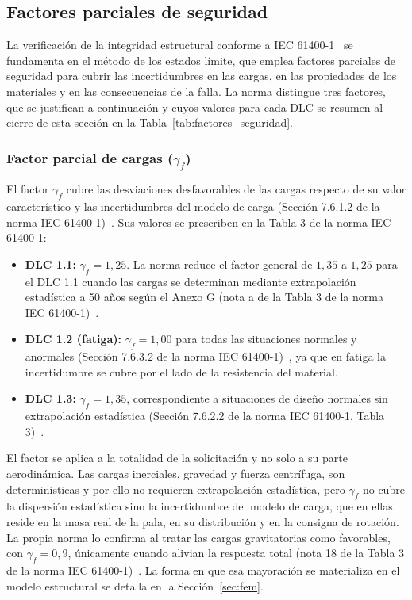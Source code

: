 \subsection{Factores parciales de seguridad}
\label{sec:factores_seguridad}

La verificación de la integridad estructural conforme a IEC 61400-1~\parencite*{IEC61400-1} se fundamenta en el método de los estados límite, que emplea factores parciales de seguridad para cubrir las incertidumbres en las cargas, en las propiedades de los materiales y en las consecuencias de la falla. La norma distingue tres factores, que se justifican a continuación y cuyos valores para cada DLC se resumen al cierre de esta sección en la Tabla~\ref{tab:factores_seguridad}.

\subsubsection{Factor parcial de cargas ($\gamma_f$)}

El factor $\gamma_f$ cubre las desviaciones desfavorables de las cargas respecto de su valor característico y las incertidumbres del modelo de carga (Sección 7.6.1.2 de la norma IEC 61400-1)~\parencite*{IEC61400-1}. Sus valores se prescriben en la Tabla 3 de la norma IEC 61400-1:

\begin{itemize}
    \item \textbf{DLC 1.1:} $\gamma_f = 1{,}25$. La norma reduce el factor general de $1{,}35$ a $1{,}25$ para el DLC 1.1 cuando las cargas se determinan mediante extrapolación estadística a 50 años según el Anexo G (nota a de la Tabla 3 de la norma IEC 61400-1)~\parencite*{IEC61400-1}.
    \item \textbf{DLC 1.2 (fatiga):} $\gamma_f = 1{,}00$ para todas las situaciones normales y anormales (Sección 7.6.3.2 de la norma IEC 61400-1)~\parencite*{IEC61400-1}, ya que en fatiga la incertidumbre se cubre por el lado de la resistencia del material.
    \item \textbf{DLC 1.3:} $\gamma_f = 1{,}35$, correspondiente a situaciones de diseño normales sin extrapolación estadística (Sección 7.6.2.2 de la norma IEC 61400-1, Tabla 3)~\parencite*{IEC61400-1}.
\end{itemize}

El factor se aplica a la totalidad de la solicitación y no solo a su parte aerodinámica. Las cargas inerciales, gravedad y fuerza centrífuga, son determinísticas y por ello no requieren extrapolación estadística, pero $\gamma_f$ no cubre la dispersión estadística sino la incertidumbre del modelo de carga, que en ellas reside en la masa real de la pala, en su distribución y en la consigna de rotación. La propia norma lo confirma al tratar las cargas gravitatorias como favorables, con $\gamma_f = 0{,}9$, únicamente cuando alivian la respuesta total (nota 18 de la Tabla 3 de la norma IEC 61400-1)~\parencite*{IEC61400-1}. La forma en que esa mayoración se materializa en el modelo estructural se detalla en la Sección~\ref{sec:fem}.

